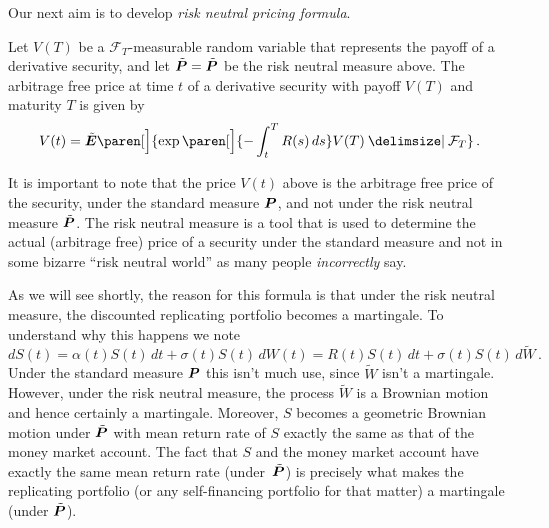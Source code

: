 Our next aim is to develop \emph{risk neutral pricing formula}.

\begin{theorem}\label{t:4rnp}
  Let $V(T)$ be a $\mathcal F_T$-measurable random variable that represents the payoff of a derivative security, and let $\tilde \P = \tilde\P$ be the risk neutral measure above.
  The arbitrage free price at time $t$ of a derivative security with payoff $V(T)$ and maturity $T$ is given by
  \begin{equation}\label{e:4rnp}
    V(t) = \tilde\E \paren[\Big]{\exp\paren[\Big]{-\int_t^T R(s) \, ds} V(T) \given \mathcal F_T }\,.
  \end{equation}
\end{theorem}
\begin{remark}
  It is important to note that the price $V(t)$ above is the arbitrage free price of the security, under the standard measure $\P$, and not under the risk neutral measure $\tilde \P$.
  The risk neutral measure is a tool that is used to determine the actual (arbitrage free) price of a security under the standard measure and not in some bizarre ``risk neutral world'' as many people \emph{incorrectly} say. 
\end{remark}

As we will see shortly, the reason for this formula is that under the risk neutral measure, the discounted replicating portfolio becomes a martingale.
To understand why this happens we note
\begin{equation}\label{e:4dS}
  dS(t) = \alpha(t) S(t) \, dt + \sigma(t) S(t) \, dW(t)
    = R(t) S(t) \, dt + \sigma(t) S(t) \, d\tilde W\,.
\end{equation}
Under the standard measure $\P$ this isn't much use, since $\tilde W$ isn't a martingale.
However, under the risk neutral measure, the process $\tilde W$ is a Brownian motion and hence certainly a martingale.
Moreover, $S$ becomes a geometric Brownian motion under $\tilde\P$ with mean return rate of $S$ exactly the same as that of the money market account.
The fact that $S$ and the money market account have exactly the same mean return rate (under~$\tilde\P$) is precisely what makes the replicating portfolio (or any self-financing  portfolio for that matter) a martingale (under $\tilde\P$).

